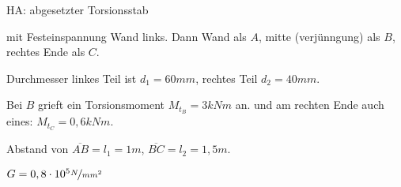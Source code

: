 \documentclass[11pt]{article}
\newcommand{\1}{ {\mathds{1}} }
\begin{document}
    \hrulefill
    
    \pagebreak
    HA: abgesetzter Torsionsstab

    mit Festeinspannung Wand links.
    Dann Wand als $A$, mitte (verjünngung) als $B$, rechtes Ende als $C$.

    Durchmesser linkes Teil ist $d_1=60mm$, rechtes Teil $d_2=40mm$.

    Bei $B$ grieft ein Torsionsmoment $M_{t_B} = 3 kNm$ an. und am rechten Ende auch eines: $M_{t_C} = 0,6 kNm$.

    Abstand von $\overline{AB} = l_1 = 1m$, $\overline{BC} = l_2 = 1,5m$.

    $G = 0,8 \cdot 10^5 \nicefrac{N}{mm^2}$
    
    \hrulefill
    
\end{document}
